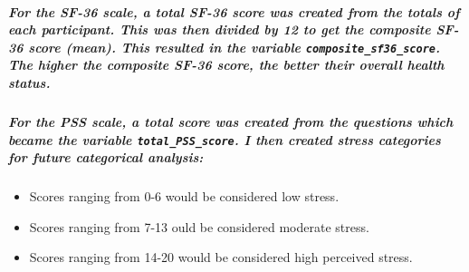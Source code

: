 \documentclass[]{article}
\providecommand{\tightlist}{%
  \setlength{\itemsep}{0pt}\setlength{\parskip}{0pt}}
\let\oldsubparagraph\subparagraph
\renewcommand{\subparagraph}[1]{\oldsubparagraph{#1}\mbox{}}
\begin{document}
\hypertarget{for-the-sf-36-scale-a-total-sf-36-score-was-created-from-the-totals-of-each-participant.-this-was-then-divided-by-12-to-get-the-composite-sf-36-score-mean.-this-resulted-in-the-variable-composite_sf36_score.-the-higher-the-composite-sf-36-score-the-better-their-overall-health-status.}{%
\subparagraph{\texorpdfstring{For the SF-36 scale, a total SF-36 score
was created from the totals of each participant. This was then divided
by 12 to get the composite SF-36 score (mean). This resulted in the
variable \texttt{composite\_sf36\_score}. The higher the composite SF-36
score, the better their overall health
status.}{For the SF-36 scale, a total SF-36 score was created from the totals of each participant. This was then divided by 12 to get the composite SF-36 score (mean). This resulted in the variable composite\_sf36\_score. The higher the composite SF-36 score, the better their overall health status.}}\label{for-the-sf-36-scale-a-total-sf-36-score-was-created-from-the-totals-of-each-participant.-this-was-then-divided-by-12-to-get-the-composite-sf-36-score-mean.-this-resulted-in-the-variable-composite_sf36_score.-the-higher-the-composite-sf-36-score-the-better-their-overall-health-status.}}

\hypertarget{for-the-pss-scale-a-total-score-was-created-from-the-questions-which-became-the-variable-total_pss_score.-i-then-created-stress-categories-for-future-categorical-analysis}{%
\subparagraph{\texorpdfstring{For the PSS scale, a total score was
created from the questions which became the variable
\texttt{total\_PSS\_score}. I then created stress categories for future
categorical
analysis:}{For the PSS scale, a total score was created from the questions which became the variable total\_PSS\_score. I then created stress categories for future categorical analysis:}}\label{for-the-pss-scale-a-total-score-was-created-from-the-questions-which-became-the-variable-total_pss_score.-i-then-created-stress-categories-for-future-categorical-analysis}}

\begin{itemize}
\tightlist
\item
  Scores ranging from 0-6 would be considered low stress.
\item
  Scores ranging from 7-13 ould be considered moderate stress.
\item
  Scores ranging from 14-20 would be considered high perceived stress.
\end{itemize}
\end{document}

